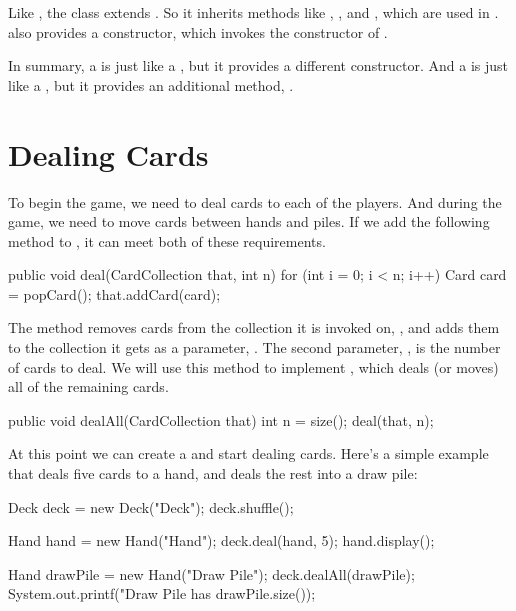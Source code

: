 Like , the  class extends .
So it inherits methods like , , and , which are used in .
 also provides a constructor, which invokes the constructor of .

In summary, a  is just like a , but it provides a different constructor.
And a  is just like a , but it provides an additional method, .



\section{Dealing Cards}
\label{dealing}

To begin the game, we need to deal cards to each of the players.
And during the game, we need to move cards between hands and piles.
If we add the following method to , it can meet both of these requirements.

\begin{code}
public void deal(CardCollection that, int n) {
    for (int i = 0; i < n; i++) {
        Card card = popCard();
        that.addCard(card);
    }
}
\end{code}

The  method removes cards from the collection it is invoked on, , and adds them to the collection it gets as a parameter, .
The second parameter, , is the number of cards to deal.
We will use this method to implement , which deals (or moves) all of the remaining cards.

\begin{code}
public void dealAll(CardCollection that) {
    int n = size();
    deal(that, n);
}
\end{code}

At this point we can create a  and start dealing cards.
Here's a simple example that deals five cards to a hand, and deals the rest into a draw pile:

\begin{code}
Deck deck = new Deck("Deck");
deck.shuffle();

Hand hand = new Hand("Hand");
deck.deal(hand, 5);
hand.display();

Hand drawPile = new Hand("Draw Pile");
deck.dealAll(drawPile);
System.out.printf("Draw Pile has %
                  drawPile.size());
\end{code}

